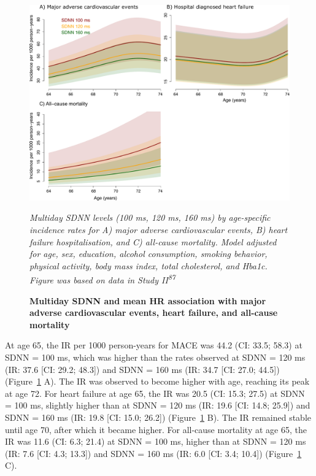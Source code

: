 \documentclass[
  a4paper,
  headsepline=true,
  open=left]{scrbook}
\begin{document}
\begin{figure}

{\centering 

\includegraphics{images/addition_pro_hrv_ir_mace.pdf}

\emph{Multiday SDNN levels (100 ms, 120 ms, 160 ms) by age-specific
incidence rates for A) major adverse cardiovascular events, B) heart
failure hospitalisation, and C) all-cause mortality. Model adjusted for
age, sex, education, alcohol consumption, smoking behavior, physical
activity, body mass index, total cholesterol, and Hba1c. Figure was
based on data in Study II\textsuperscript{87}}

}

\caption{\label{fig-addprohrv}\textbf{Multiday SDNN and mean HR
association with major adverse cardiovascular events, heart failure, and
all-cause mortality}}

\end{figure}

\restoregeometry

At age 65, the IR per 1000 person-years for MACE was 44.2 (CI: 33.5;
58.3) at SDNN = 100 ms, which was higher than the rates observed at SDNN
= 120 ms (IR: 37.6 {[}CI: 29.2; 48.3{]}) and SDNN = 160 ms (IR: 34.7
{[}CI: 27.0; 44.5{]}) (Figure~\ref{fig-addprohrv} A). The IR was
observed to become higher with age, reaching its peak at age 72. For
heart failure at age 65, the IR was 20.5 (CI: 15.3; 27.5) at SDNN = 100
ms, slightly higher than at SDNN = 120 ms (IR: 19.6 {[}CI: 14.8;
25.9{]}) and SDNN = 160 ms (IR: 19.8 {[}CI: 15.0; 26.2{]})
(Figure~\ref{fig-addprohrv} B). The IR remained stable until age 70,
after which it became higher. For all-cause mortality at age 65, the IR
was 11.6 (CI: 6.3; 21.4) at SDNN = 100 ms, higher than at SDNN = 120 ms
(IR: 7.6 {[}CI: 4.3; 13.3{]}) and SDNN = 160 ms (IR: 6.0 {[}CI: 3.4;
10.4{]}) (Figure~\ref{fig-addprohrv} C).
\end{document}
